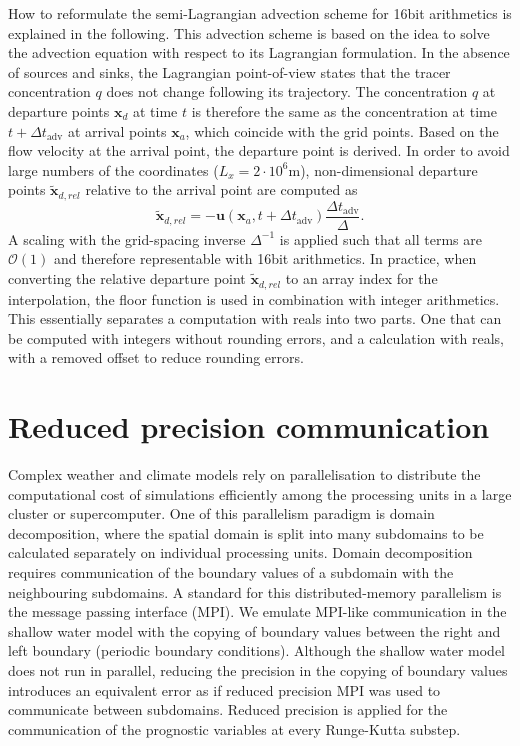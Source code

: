 \documentclass[draft]{agujournal2019}
\newcommand{\op}{\operatorname}
\begin{document}
How to reformulate the semi-Lagrangian advection scheme for 16bit arithmetics is explained in the following. This advection scheme is based on the idea to solve the advection equation with respect to its Lagrangian formulation. In the absence of sources and sinks, the Lagrangian point-of-view states that the tracer concentration $q$ does not change following its trajectory. The concentration $q$ at departure points $\mathbf{x}_d$ at time $t$ is therefore the same as the concentration at time $t+\Delta t_{\op{adv}}$ at arrival points $\mathbf{x}_a$, which coincide with the grid points. Based on the flow velocity at the arrival point, the departure point is derived. In order to avoid large numbers of the coordinates ($L_x = 2 \cdot 10^6$m), non-dimensional departure points $\mathbf{\tilde{x}}_{d,rel}$ relative to the arrival point are computed as
\begin{equation}
\mathbf{\tilde{x}}_{d,rel} = - \mathbf{u}(\mathbf{x}_a,t+\Delta t_{\op{adv}}) \frac{\Delta t_{\op{adv}}}{\Delta}.
\label{eq:relcoord}
\end{equation}
A scaling with the grid-spacing inverse $\Delta^{-1}$ is applied such that all terms are $\mathcal{O}(1)$ and therefore representable with 16bit arithmetics. In practice, when converting the relative departure point $\mathbf{\tilde{x}}_{d,rel}$ to an array index for the interpolation, the floor function is used in combination with integer arithmetics. This essentially separates a computation with reals into two parts. One that can be computed with integers without rounding errors, and a calculation with reals, with a removed offset to reduce rounding errors.

\section{Reduced precision communication}
\label{sec:comm}

Complex weather and climate models rely on parallelisation to distribute the computational cost of simulations efficiently among the processing units in a large cluster or supercomputer. One of this parallelism paradigm is domain decomposition, where the spatial domain is split into many subdomains to be calculated separately on individual processing units. Domain decomposition requires communication of the boundary values of a subdomain with the neighbouring subdomains. A standard for this distributed-memory parallelism is the message passing interface (MPI). We emulate MPI-like communication in the shallow water model with the copying of boundary values between the right and left boundary (periodic boundary conditions). Although the shallow water model does not run in parallel, reducing the precision in the copying of boundary values introduces an equivalent error as if reduced precision MPI was used to communicate between subdomains. Reduced precision is applied for the communication of the prognostic variables at every Runge-Kutta substep.
\end{document}
